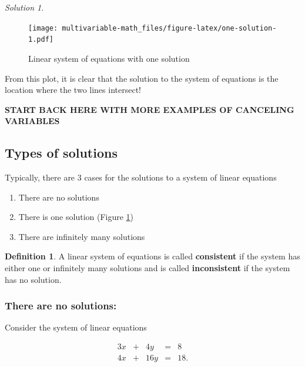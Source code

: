 \documentclass[
]{book}
\providecommand{\tightlist}{%
  \setlength{\itemsep}{0pt}\setlength{\parskip}{0pt}}
\theoremstyle{definition}
\newtheorem{definition}{Definition}[chapter]
\theoremstyle{definition}
\theoremstyle{definition}
\theoremstyle{definition}
\theoremstyle{remark}
\newtheorem*{solution}{Solution}
\begin{document}
\begin{solution}
\begin{figure}
\centering
\texttt{[image: multivariable-math\_files/figure-latex/one-solution-1.pdf]}
\caption{\label{fig:one-solution}Linear system of equations with one solution}
\end{figure}

From this plot, it is clear that the solution to the system of equations is the location where the two lines intersect!
\end{solution}

\textbf{START BACK HERE WITH MORE EXAMPLES OF CANCELING VARIABLES}

\hypertarget{types-of-solutions}{%
\subsection{Types of solutions}\label{types-of-solutions}}

Typically, there are 3 cases for the solutions to a system of linear equations

\begin{enumerate}
\def\labelenumi{\arabic{enumi})}
\tightlist
\item
  There are no solutions
\item
  There is one solution (Figure \ref{fig:one-solution})
\item
  There are infinitely many solutions
\end{enumerate}

\begin{definition}
A linear system of equations is called \textbf{consistent} if the system has either one or infinitely many solutions and is called \textbf{inconsistent} if the system has no solution.
\end{definition}

\hypertarget{there-are-no-solutions}{%
\subsubsection{There are no solutions:}\label{there-are-no-solutions}}

Consider the system of linear equations

\begin{alignat*}{3}
x   & {}+{} & 4 y & {}={} & 8 \\
4 x & {}+{} & 16 y & {}={} & 18.
\end{alignat*}
\end{document}
